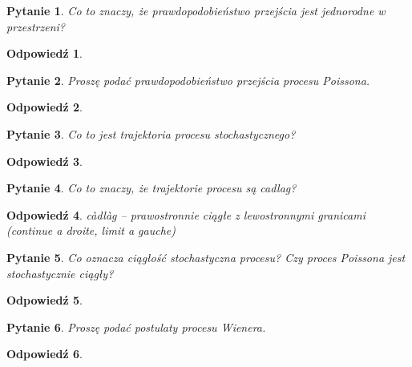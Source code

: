 \documentclass[12pt]{mwart}
\theoremstyle{plain}
\newtheorem{pytanie}{Pytanie}
\theoremstyle{break}
\newtheorem*{odpowiedź}{Odpowiedź}
\begin{document}
\begin{pytanie}
Co to znaczy, że prawdopodobieństwo przejścia jest jednorodne w przestrzeni?
\end{pytanie}
\begin{odpowiedź}
\end{odpowiedź}


\begin{pytanie}
Proszę podać prawdopodobieństwo przejścia procesu Poissona.
\end{pytanie}
\begin{odpowiedź}
\end{odpowiedź}


\begin{pytanie}
Co to jest trajektoria procesu stochastycznego?
\end{pytanie}
\begin{odpowiedź}
\end{odpowiedź}


\begin{pytanie}
Co to znaczy, że trajektorie procesu są cadlag?
\end{pytanie}
\begin{odpowiedź}
    càdlàg – prawostronnie ciągłe z lewostronnymi granicami
    (continue a droite, limit a gauche)
\end{odpowiedź}


\begin{pytanie}
Co oznacza ciągłość stochastyczna procesu? Czy proces Poissona jest stochastycznie ciągły?
\end{pytanie}
\begin{odpowiedź}
\end{odpowiedź}


\begin{pytanie}
Proszę podać postulaty procesu Wienera.
\end{pytanie}
\begin{odpowiedź}
\end{odpowiedź}
\end{document}
